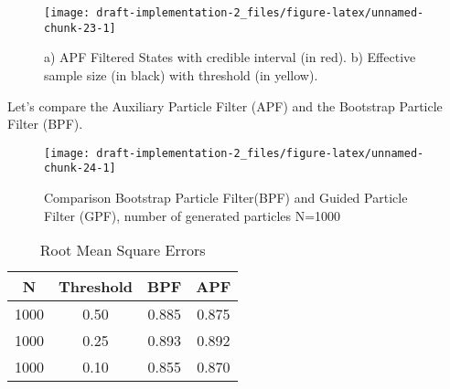 \documentclass[
]{article}
\begin{document}
\begin{figure}[ht]

{\centering \texttt{[image: draft-implementation-2\_files/figure-latex/unnamed-chunk-23-1]} 

}

\caption{a) APF Filtered States with credible interval (in red). b) Effective sample size (in black) with threshold (in yellow).}\label{fig:unnamed-chunk-23}
\end{figure}

Let's compare the Auxiliary Particle Filter (APF) and the Bootstrap
Particle Filter (BPF).

\begin{figure}[ht]

{\centering \texttt{[image: draft-implementation-2\_files/figure-latex/unnamed-chunk-24-1]} 

}

\caption{Comparison Bootstrap Particle Filter(BPF) and Guided Particle Filter (GPF), number of generated particles N=1000}\label{fig:unnamed-chunk-24}
\end{figure}

\begin{longtable}[t]{cccc}
\caption{\label{tab:unnamed-chunk-26}Root Mean Square Errors}\\
\toprule
N & Threshold & BPF & APF\\
\midrule
1000 & 0.50 & 0.885 & 0.875\\
1000 & 0.25 & 0.893 & 0.892\\
1000 & 0.10 & 0.855 & 0.870\\
\bottomrule
\end{longtable}
\end{document}
